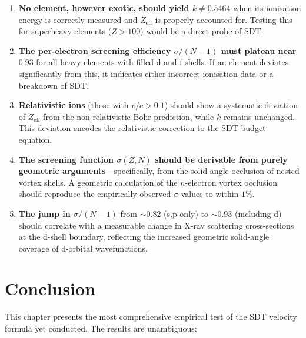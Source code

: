 \begin{enumerate}
  \item \textbf{No element, however exotic, should yield $k \neq 0.5464$} when its ionisation energy is correctly measured and $Z_{\text{eff}}$ is properly accounted for.  Testing this for superheavy elements ($Z > 100$) would be a direct probe of SDT.

  \item \textbf{The per-electron screening efficiency $\sigma/(N{-}1)$ must plateau near $0.93$} for all heavy elements with filled d and f shells.  If an element deviates significantly from this, it indicates either incorrect ionisation data or a breakdown of SDT.

  \item \textbf{Relativistic ions} (those with $v/c > 0.1$) should show a systematic deviation of $Z_{\text{eff}}$ from the non-relativistic Bohr prediction, while $k$ remains unchanged.  This deviation encodes the relativistic correction to the SDT budget equation.

  \item \textbf{The screening function $\sigma(Z, N)$ should be derivable from purely geometric arguments}---specifically, from the solid-angle occlusion of nested vortex shells.  A geometric calculation of the $n$-electron vortex occlusion should reproduce the empirically observed $\sigma$ values to within $1\%$.

  \item \textbf{The jump in $\sigma/(N{-}1)$} from $\sim 0.82$ (s,p-only) to $\sim 0.93$ (including d) should correlate with a measurable change in X-ray scattering cross-sections at the d-shell boundary, reflecting the increased geometric solid-angle coverage of d-orbital wavefunctions.
\end{enumerate}


\section{Conclusion}

This chapter presents the most comprehensive empirical test of the SDT velocity formula yet conducted.  The results are unambiguous:

